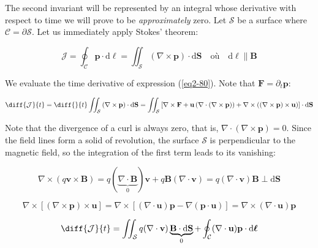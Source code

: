The second invariant will be represented by an integral whose derivative with respect to time we will prove to be \textit{approximately} zero. Let $\mathcal{S}$ be a surface where $\mathcal{C}=\partial\mathcal{S}$. Let us immediately apply Stokes' theorem:

\begin{equation}
    \label{eq2-80}
    \mathcal{J}=\oint_\mathcal{C}\mathbf{p}\cdot\mathrm{d}\boldsymbol{\ell}=\iint_\mathcal{S}\left(\nabla\times\mathbf{p}\right)\cdot\mathrm{d}\mathbf{S}\quad\text{où}\quad\mathrm{d}\boldsymbol{\ell}\parallel\mathbf{B}
\end{equation}

We evaluate the time derivative of expression (\ref{eq2-80}). Note that $\mathbf{F}=\partial_t\mathbf{p}$:

\begin{equation}
    \diff{\mathcal{J}}{t}=\diff{}{t}\iint_\mathcal{S}\left(\nabla\times\mathbf{p}\right)\cdot\mathrm{d}\mathbf{S}=\iint_\mathcal{S}\left[\nabla\times\mathbf{F}+\mathbf{u}\left(\nabla\cdot(\nabla\times\mathbf{p})\right)+\nabla\times\left((\nabla\times\mathbf{p})\times\mathbf{u}\right)\right]\cdot\mathrm{d}\mathbf{S}
\end{equation}

Note that the divergence of a curl is always zero, that is, $\nabla\cdot(\nabla\times\mathbf{p})=0$. Since the field lines form a solid of revolution, the surface $\mathcal{S}$ is perpendicular to the magnetic field, so the integration of the first term leads to its vanishing:

\begin{equation}
    \nabla\times(q\mathbf{v}\times\mathbf{B})= q(\underbrace{\nabla\cdot\mathbf{B}}_0)\mathbf{v}+q\mathbf{B}(\nabla\cdot\mathbf{v})=q(\nabla\cdot\mathbf{v})\mathbf{B}\perp\mathrm{d}\mathbf{S}
\end{equation}

\begin{equation}
    \nabla\times\left[(\nabla\times\mathbf{p})\times\mathbf{u}\right] =\nabla\times\left[(\nabla\cdot\mathbf{u})\mathbf{p}-\nabla(\mathbf{p}\cdot\mathbf{u})\right]=\nabla\times(\nabla\cdot\mathbf{u})\mathbf{p}
\end{equation}

\begin{equation}
    \diff{\mathcal{J}}{t}=\iint_\mathcal{S}q(\nabla\cdot\mathbf{v})\underbrace{\mathbf{B}\cdot\mathrm{d}\mathbf{S}}_0+\oint_\mathcal{C}(\nabla\cdot\mathbf{u})\mathbf{p}\cdot\mathrm{d}\boldsymbol{\ell}
\end{equation}

